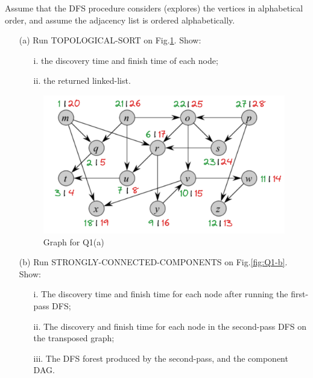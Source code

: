 \noindent {} 
Assume that the DFS procedure considers (explores) the vertices in alphabetical order, and assume the adjacency list is ordered alphabetically.
\begin{itemize}
    \item[(a)] Run TOPOLOGICAL-SORT on Fig.\ref{fig:Q1-a}. Show:
    \begin{itemize}
        \item[i.] the discovery time and finish time of each node;\\
        \item[ii.] the returned linked-list. \\
    \end{itemize}
\begin{figure}[!h]
    \centering
    \includegraphics[width=0.65\linewidth]{HWs//HW9//figures/1-1-my.png}
    \caption{Graph for Q1(a)}
    \label{fig:Q1-a}
\end{figure}
    \item[(b)] Run STRONGLY-CONNECTED-COMPONENTS on Fig.\ref{fig:Q1-b}. Show:
    \begin{itemize}
        \item[i.] The discovery time and finish time for each node after running the first-pass DFS;\\
        \item[ii.] The discovery and finish time for each node in the second-pass DFS on the transposed graph;\\
        \item[iii.] The DFS forest produced by the second-pass, and the component DAG.\\
    \end{itemize}
\end{itemize}
